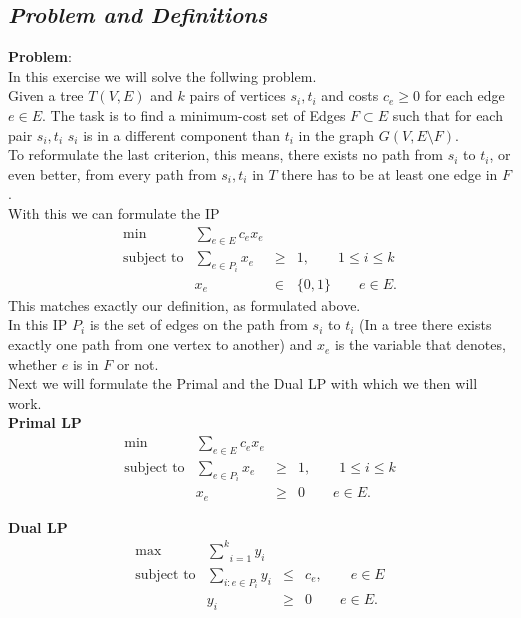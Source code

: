 \subsection*{\itshape Problem and Definitions}
\textbf{Problem}:\\
In this exercise we will solve the follwing problem.\\
Given a tree $T(V,E)$ and $k$ pairs of vertices $s_i,t_i$ and costs $c_e \geq 0$
for each edge $e \in E$. The task is to find a minimum-cost set of Edges $F \subset E$
such that for each pair $s_i,t_i$ $s_i$ is in a different component than
$t_i$ in the graph $G(V,E \setminus F)$.\\

To reformulate the last criterion, this means, there exists no path from $s_i$ to $t_i$,
or even better, from every path from $s_i,t_i$ in $T$ there has to be at least one edge
in $F$.\\

With this we can formulate the IP
$$\begin{array}{rrcl}
   \text{min}&\underset{e\in E}{\sum} c_e x_e &&\\
   \text{subject to} &
      \underset{e \in P_i}{\sum} x_e & \geq & 1, \qquad 1\leq i \leq k\\
      & x_e &\in & \{0,1\} \qquad e \in E.
\end{array}$$
This matches exactly our definition, as formulated above.\\
In this IP $P_i$ is the set of edges on the path from $s_i$ to $t_i$ (In
a tree there exists exactly one path from one vertex to another) and $x_e$ is
the variable that denotes, whether $e$ is in $F$ or not.\\

Next we will formulate the Primal and the Dual LP with which we then will work.\\

\textbf{Primal LP}
$$\begin{array}{rrcl}
   \text{min}&\underset{e\in E}{\sum} c_e x_e &&\\
   \text{subject to} &
      \underset{e \in P_i}{\sum} x_e & \geq & 1, \qquad 1\leq i \leq k\\
      & x_e &\geq & 0 \qquad e \in E.
\end{array}$$

\textbf{Dual LP}
$$\begin{array}{rrcl}
   \text{max}&\underset{i=1}{\overset{k}{\sum}} y_i &&\\
   \text{subject to} &
      \underset{i : e \in P_i}{\sum} y_i & \leq & c_e, \qquad e \in E\\
      & y_i &\geq & 0 \qquad e \in E.
\end{array}$$

